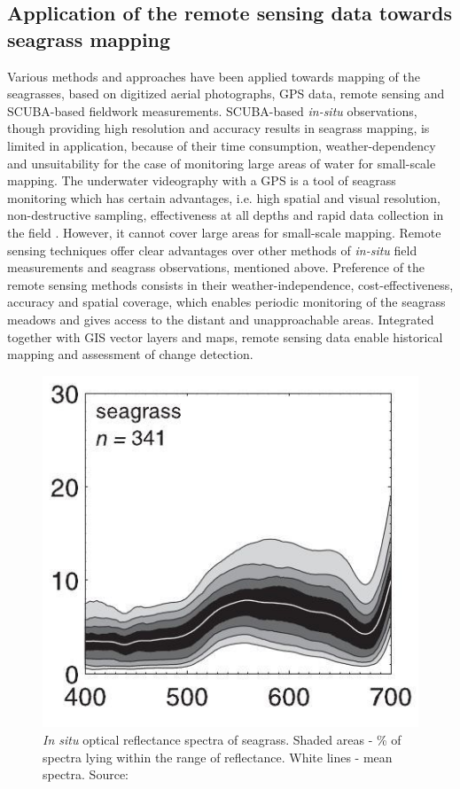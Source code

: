 \documentclass[10pt, a4paper]{article}
\begin{document}
\subsection[Application of the remote sensing...]{Application of the remote sensing data towards seagrass mapping}
Various methods and approaches have been applied towards mapping of the seagrasses, based on
digitized aerial photographs, GPS data, remote sensing and SCUBA-based fieldwork measurements.
SCUBA-based \textit{in-situ} observations, though providing high resolution and accuracy results in seagrass
mapping, is limited in application, because of their time consumption, weather-dependency and
unsuitability for the case of monitoring large areas of water for small-scale mapping. 
The underwater videography with a GPS is a tool of seagrass monitoring which has certain advantages, i.e.
high spatial and visual resolution, non-destructive sampling, effectiveness at all depths and rapid data
collection in the field \cite{Schultz08}\label{Schultz08}. However, it cannot cover large areas for small-scale mapping.
Remote sensing techniques offer clear advantages over other methods of \textit{in-situ} field measurements
and seagrass observations, mentioned above. Preference of the remote sensing methods consists in
their weather-independence, cost-effectiveness, accuracy and spatial coverage, which enables
periodic monitoring of the seagrass meadows and gives access to the distant and unapproachable
areas. Integrated together with GIS vector layers and maps, remote sensing data enable historical
mapping \cite{Carter08,Ardizzone06}\label{Carter08} \label{Ardizzone06} and assessment of change detection.

\begin{figure}
	\centering
	\includegraphics[scale=0.30]{Fig-11.jpg}
	\caption{\textit{In situ} optical reflectance spectra of seagrass. Shaded areas - \% of spectra lying within the range of reflectance. 
		White lines - mean spectra. Source: \cite{Hochberg03b}\label{Hochberg03b}}
	\label{fig:13}
\end{figure}
\end{document}
